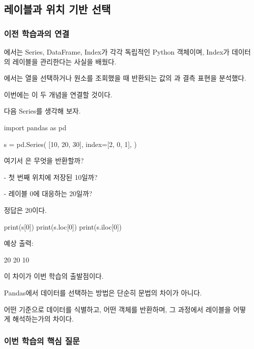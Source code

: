 

\subsection{레이블과 위치 기반 선택}

\subsubsection{이전 학습과의 연결}

에서는 Series, DataFrame, Index가 각각 독립적인 Python 객체이며, Index가 데이터의 레이블을 관리한다는 사실을 배웠다.

에서는 열을 선택하거나 원소를 조회했을 때 반환되는 값의 과 결측 표현을 분석했다.

이번에는 이 두 개념을 연결할 것이다.

다음 Series를 생각해 보자.

\begin{dhkcode}
import pandas as pd

s = pd.Series(
    [10, 20, 30],
    index=[2, 0, 1],
)
\end{dhkcode}

여기서 은 무엇을 반환할까?

\begin{dhksmry}
    - 첫 번째 위치에 저장된 10일까?

    - 레이블 0에 대응하는 20일까?
\end{dhksmry}

정답은 20이다.

\begin{dhkcode}
print(s[0])
print(s.loc[0])
print(s.iloc[0])
\end{dhkcode}

예상 출력:

\begin{dhkzsh}
20
20
10
\end{dhkzsh}

이 차이가 이번 학습의 출발점이다.

Pandas에서 데이터를 선택하는 방법은 단순히 문법의 차이가 아니다.

어떤 기준으로 데이터를 식별하고, 어떤 객체를 반환하며, 그 과정에서 레이블을 어떻게 해석하는가의 차이다.

\subsubsection{이번 학습의 핵심 질문}


